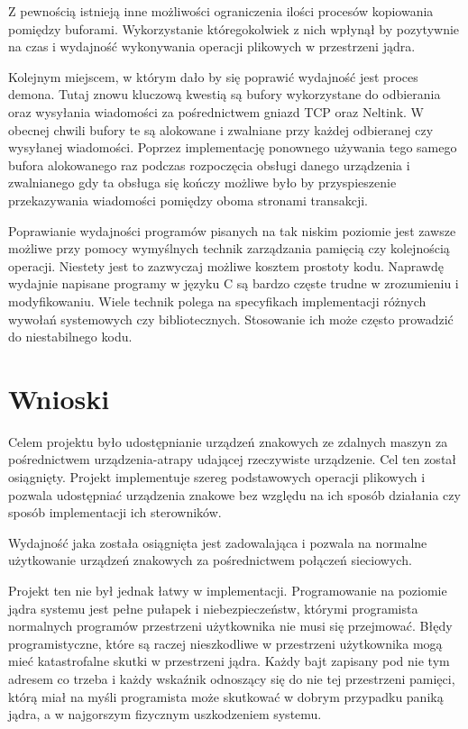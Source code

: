 \documentclass[10pt]{scrartcl}
\begin{document}
Z pewnością istnieją inne możliwości ograniczenia ilości procesów kopiowania pomiędzy buforami. Wykorzystanie któregokolwiek z nich wpłynął by pozytywnie na czas i wydajność wykonywania operacji plikowych w przestrzeni jądra.

Kolejnym miejscem, w którym dało by się poprawić wydajność jest proces demona. Tutaj znowu kluczową kwestią są bufory wykorzystane do odbierania oraz wysyłania wiadomości za pośrednictwem gniazd TCP oraz Neltink. W obecnej chwili bufory te są alokowane i zwalniane przy każdej odbieranej czy wysyłanej wiadomości. Poprzez implementację ponownego używania tego samego bufora alokowanego raz podczas rozpoczęcia obsługi danego urządzenia i zwalnianego gdy ta obsługa się kończy możliwe było by przyspieszenie przekazywania wiadomości pomiędzy oboma stronami transakcji.

Poprawianie wydajności programów pisanych na tak niskim poziomie jest zawsze możliwe przy pomocy wymyślnych technik zarządzania pamięcią czy kolejnością operacji. Niestety jest to zazwyczaj możliwe kosztem prostoty kodu. Naprawdę wydajnie napisane programy w języku C są bardzo częste trudne w zrozumieniu i modyfikowaniu. Wiele technik polega na specyfikach implementacji różnych wywołań systemowych czy bibliotecznych. Stosowanie ich może często prowadzić do niestabilnego kodu.

\section{Wnioski}

Celem projektu było udostępnianie urządzeń znakowych ze zdalnych maszyn za pośrednictwem urządzenia-atrapy udającej rzeczywiste urządzenie. Cel ten został osiągnięty. Projekt implementuje szereg podstawowych operacji plikowych i pozwala udostępniać urządzenia znakowe bez względu na ich sposób działania czy sposób implementacji ich sterowników.

Wydajność jaka została osiągnięta jest zadowalająca i pozwala na normalne użytkowanie urządzeń znakowych za pośrednictwem połączeń sieciowych.

Projekt ten nie był jednak łatwy w implementacji. Programowanie na poziomie jądra systemu jest pełne pułapek i niebezpieczeństw, którymi programista normalnych programów przestrzeni użytkownika nie musi się przejmować. Błędy programistyczne, które są raczej nieszkodliwe w przestrzeni użytkownika mogą mieć katastrofalne skutki w przestrzeni jądra. Każdy bajt zapisany pod nie tym adresem co trzeba i każdy wskaźnik odnoszący się do nie tej przestrzeni pamięci, którą miał na myśli programista może skutkować w dobrym przypadku paniką jądra, a w najgorszym fizycznym uszkodzeniem systemu.
\end{document}
